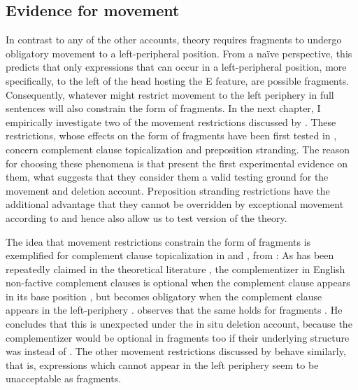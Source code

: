 \subsection{Evidence for movement}
\label{sec:theories-predictions-movement}

In contrast to any of the other accounts,  theory requires fragments to undergo obligatory movement to a left-peripheral position. From a na\"{i}ve perspective, this predicts that only expressions that can occur in a left-peripheral position, more specifically, to the left of the head hosting the E feature, are possible fragments. Consequently, whatever might restrict movement to the left periphery in full sentences will also constrain the form of fragments. In the next chapter, I empirically investigate two of the movement restrictions discussed by \citet{merchant2004}. These restrictions, whose effects on the form of fragments have been first tested in \citet{merchant.etal2013}, concern complement clause topicalization and preposition stranding. The reason for choosing these phenomena is that \citet{merchant.etal2013} present the first experimental evidence on them, what suggests that they consider them a valid testing ground for the movement and deletion account. Preposition stranding restrictions have the additional advantage that they cannot be overridden by exceptional movement according to \citet{weir2015} and hence also allow us to test  version of the theory.

The idea that movement restrictions constrain the form of fragments is exemplified for complement clause topicalization in \Next and \NNext, from \citet[690]{merchant2004}: As has been repeatedly claimed in the theoretical literature \citep[see e.g.][]{morgan1973, chomsky1981, stowell1981, webelhuth1992}, the complementizer in English non-factive complement clauses is optional when the complement clause appears in its base position \Next[a], but becomes obligatory when the complement clause appears in the left-periphery \Next[b]. \citet{merchant2004} observes that the same holds for fragments \NNext. He concludes that this is unexpected under the in situ deletion account, because the complementizer would be optional in fragments too if their underlying structure was \Next[a] instead of \Next[b]. The other movement restrictions discussed by \citet{merchant2004} behave similarly, that is, expressions which cannot appear in the left periphery seem to be unacceptable as fragments. 

